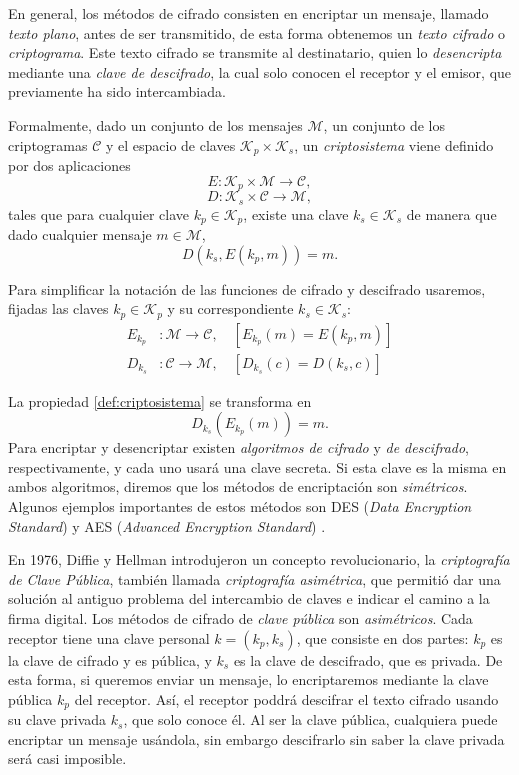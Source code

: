 En general, los métodos de cifrado consisten en encriptar un mensaje, llamado \emph{texto plano}, antes de ser transmitido, de esta forma obtenemos un \emph{texto cifrado} o \emph{criptograma}. Este texto cifrado se transmite al destinatario, quien lo \emph{desencripta} mediante una \emph{clave de descifrado}, la cual solo conocen el receptor y el emisor, que previamente ha sido intercambiada.

Formalmente, dado un conjunto de los mensajes $\mathcal{M}$, un conjunto de los criptogramas $\mathcal{C}$ y el espacio de claves $\mathcal{K}_p \times \mathcal{K}_s$, un \emph{criptosistema} viene definido por dos aplicaciones
\[
    E : \mathcal{K}_p \times \mathcal{M} \rightarrow \mathcal{C},
\]
\[
    D : \mathcal{K}_s \times \mathcal{C} \rightarrow \mathcal{M},
\]
tales que para cualquier clave $k_p \in \mathcal{K}_p$, existe una clave $k_s \in \mathcal{K}_s$ de manera que dado cualquier mensaje $m \in \mathcal{M}$,
\begin{equation}
    \label{def:criptosistema}
    D(k_s, E(k_p, m)) = m.
\end{equation}

Para simplificar la notación de las funciones de cifrado y descifrado usaremos, fijadas las claves $k_p \in \mathcal{K}_p$ y su correspondiente $k_s \in \mathcal{K}_s$:
\begin{align*} 
    E_{k_p} &: \mathcal{M} \rightarrow \mathcal{C}, \quad [ E_{k_p} (m) = E(k_p, m) ]\\ 
    D_{k_s} &: \mathcal{C} \rightarrow \mathcal{M}, \quad [ D_{k_s} (c) = D(k_s, c) ]
\end{align*}

La propiedad \ref{def:criptosistema} se transforma en
\[
    D_{k_s} \left( E_{k_p}(m) \right) = m.
\]
Para encriptar y desencriptar existen \emph{algoritmos de cifrado} y \emph{de descifrado}, respectivamente, y cada uno usará una clave secreta. Si esta clave es la misma en ambos algoritmos, diremos que los métodos de encriptación son \emph{simétricos}. Algunos ejemplos importantes de estos métodos son DES (\emph{Data Encryption Standard}) y AES (\emph{Advanced Encryption Standard}) \cite[Sección 2.1]{Introduction_to_cryptography}.

En 1976, Diffie y Hellman \cite{Diffie_Hellman_1976} introdujeron un concepto revolucionario, la \emph{criptografía de Clave Pública}, también llamada \emph{criptografía asimétrica}, que permitió dar una solución al antiguo problema del intercambio de claves e indicar el camino a la firma digital. Los métodos de cifrado de \emph{clave pública} son \emph{asimétricos}. Cada receptor tiene una clave personal $k = (k_p, k_s)$, que consiste en dos partes: $k_p$ es la clave de cifrado y es pública, y $k_s$ es la clave de descifrado, que es privada. De esta forma, si queremos enviar un mensaje, lo encriptaremos mediante la clave pública $k_p$ del receptor. Así, el receptor poddrá descifrar el texto cifrado usando su clave privada $k_s$, que solo conoce él. Al ser la clave pública, cualquiera puede encriptar un mensaje usándola, sin embargo descifrarlo sin saber la clave privada será casi imposible.

